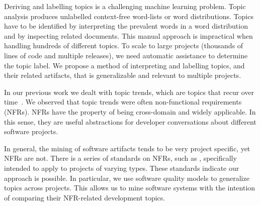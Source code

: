 \documentclass[]{sig-alternate}
\begin{document}
Deriving and labelling topics is a challenging machine learning problem. 
Topic analysis produces %
 unlabelled context-free word-lists or word distributions.
Topics have to be identified by interpreting the prevalent words in a word distribution and by inspecting related documents. 
This manual approach is impractical when handling hundreds of different topics. To scale to large projects (thousands of lines of code and multiple releases), we need automatic assistance to determine the topic label.
We propose a method of interpreting and labelling topics, and their related artifacts, that is generalizable and relevant to multiple projects.

In our previous work we dealt with topic trends, which are topics that recur over time~\cite{Hindle09ICSM}. 
We observed that topic trends were often non-functional requirements (NFRs). 
NFRs have the property of being cross-domain and widely applicable. 
In this sense, they are useful abstractions for developer conversations about different software projects.

In general, the mining of software artifacts tends to be very project specific, yet NFRs are not. 
There is a series of standards on NFRs, such as \cite{iso9126}, specifically intended to apply to projects of varying types.
These standards indicate our approach is possible. %
In particular, we use software quality models to generalize topics across projects. 
This allows us to mine software systems with the intention of comparing their NFR-related development topics.
\end{document}
